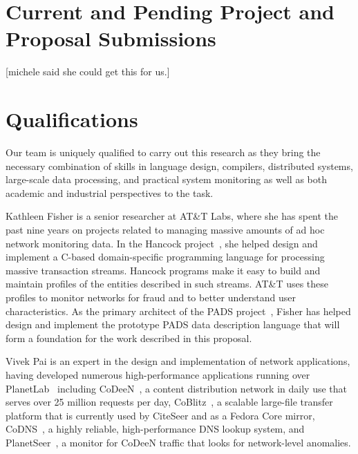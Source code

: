 \documentclass[12pt]{article}
\begin{document}
\section{Current and Pending Project and Proposal Submissions}

[michele said she could get this for us.]



\section{Qualifications}

Our team is uniquely qualified to carry out this research as they
bring the necessary combination of skills in language design,
compilers, distributed systems, large-scale data processing, and
practical system monitoring as well as both academic and industrial
perspectives to the task.  

Kathleen Fisher is a senior researcher at AT\&T Labs,
where she has spent the past nine years on projects
related to managing massive amounts of ad hoc network monitoring data.
In the Hancock project~\cite{kdd00,hancock-toplas}, she helped 
design and implement a C-based
domain-specific programming language for processing massive  
transaction streams.  Hancock programs make it easy to build
and maintain profiles of the entities described in such streams. 
AT\&T uses these profiles to monitor networks for fraud 
and to better understand user characteristics.
As the primary architect of the PADS project~\cite{fisher+:pads}, 
Fisher has helped design and implement the prototype PADS
data description language that will form a foundation for the work
described in this proposal.  

Vivek Pai is an expert in the
design and implementation of network applications, having developed
numerous high-performance applications running over
PlanetLab~\cite{planetlab} including CoDeeN~\cite{codeen}, a content
distribution network in daily use that serves over 25 million
requests per day, CoBlitz~\cite{coblitz}, a scalable large-file
transfer platform that is currently used by CiteSeer and as
a Fedora Core mirror, CoDNS~\cite{codns}, a highly reliable,
high-performance DNS lookup system, and PlanetSeer~\cite{planetseer},
a monitor for CoDeeN traffic that looks for network-level anomalies.
\end{document}
